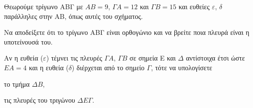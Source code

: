 Θεωρούμε τρίγωνο ΑΒΓ με $AB = 9$, $\Gamma A = 12$ και $\Gamma B = 15$ και ευθείες $\varepsilon$, $\delta$ παράλληλες στην ΑΒ, όπως αυτές του σχήματος.
\begin{alist}
    \item Να αποδείξετε ότι το τρίγωνο ΑΒΓ είναι ορθογώνιο και να βρείτε ποια πλευρά είναι η υποτείνουσά του. 
    \item Αν η ευθεία ($\varepsilon$) τέμνει τις πλευρές $\Gamma A$, $\Gamma B$ σε σημεία Ε και $\Delta$ αντίστοιχα έτσι ώστε $EA = 4$ και η ευθεία ($\delta$) διέρχεται από το σημείο $\Gamma$, τότε να υπολογίσετε
    \begin{rlist}
        \item το τμήμα $\Delta B$, 
        \item τις πλευρές του τριγώνου $\Delta E \Gamma$. 
    \end{rlist}
\end{alist}